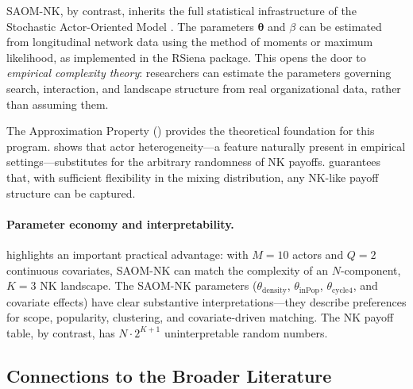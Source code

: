 \documentclass[12pt]{article}
\newcommand{\btheta}{\boldsymbol{\theta}}
\begin{document}
SAOM-NK, by contrast, inherits the full statistical infrastructure of the
Stochastic Actor-Oriented Model \citep{snijders2010introduction}. The
parameters $\btheta$ and $\beta$ can be estimated from longitudinal
network data using the method of moments or maximum likelihood, as
implemented in the RSiena package. This opens the door to
\emph{empirical complexity theory}: researchers can estimate the
parameters governing search, interaction, and landscape structure from
real organizational data, rather than assuming them.

The Approximation Property () provides the
theoretical foundation for this program.  shows
that actor heterogeneity---a feature naturally present in empirical
settings---substitutes for the arbitrary randomness of NK payoffs.
 guarantees that, with sufficient flexibility in
the mixing distribution, any NK-like payoff structure can be captured.

\paragraph{Parameter economy and interpretability.}
 highlights an important practical advantage:
with $M = 10$ actors and $Q = 2$ continuous covariates, SAOM-NK can match
the complexity of an $N$-component, $K = 3$ NK landscape. The SAOM-NK
parameters ($\theta_{\mathrm{density}}$, $\theta_{\mathrm{inPop}}$,
$\theta_{\mathrm{cycle4}}$, and covariate effects) have clear substantive
interpretations---they describe preferences for scope, popularity,
clustering, and covariate-driven matching. The NK payoff table, by
contrast, has $N \cdot 2^{K+1}$ uninterpretable random numbers.

\subsection{Connections to the Broader Literature}
\end{document}
